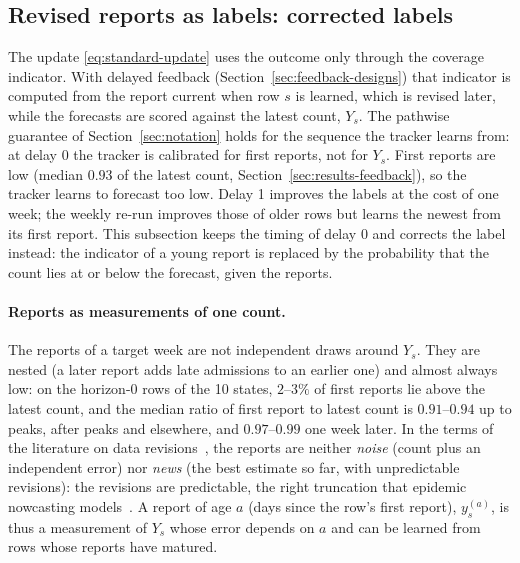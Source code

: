 \documentclass[11pt,a4paper]{article}
\theoremstyle{definition}
\theoremstyle{remark}
\begin{document}
\subsection{Revised reports as labels: corrected labels}
\label{sec:corrected-labels}
The update \eqref{eq:standard-update} uses the outcome only through the
coverage indicator. With delayed feedback
(Section~\ref{sec:feedback-designs}) that indicator is computed from the
report current when row $s$ is learned, which is revised later, while the
forecasts are scored against the latest count, $Y_s$. The pathwise
guarantee of Section~\ref{sec:notation} holds for the sequence the tracker
learns from: at delay 0 the tracker is calibrated for first reports, not
for $Y_s$. First reports are low (median $0.93$ of the latest count,
Section~\ref{sec:results-feedback}), so the tracker learns to forecast too
low. Delay 1 improves the labels at the cost of one week; the weekly
re-run improves those of older rows but learns the newest from its first
report. This subsection keeps the timing of delay 0 and corrects the label
instead: the indicator of a young report is replaced by the probability
that the count lies at or below the forecast, given the reports.

\paragraph{Reports as measurements of one count.} The reports of a target
week are not independent draws around $Y_s$. They are nested (a later
report adds late admissions to an earlier one) and almost always low: on
the horizon-0 rows of the 10 states, $2$--$3\%$ of first reports lie above
the latest count, and the median ratio of first report to latest count is
$0.91$--$0.94$ up to peaks, after peaks and elsewhere, and $0.97$--$0.99$
one week later. In the terms of the literature on data
revisions~\cite{mankiw-shapiro}, the reports are neither \emph{noise}
(count plus an independent error) nor \emph{news} (the best estimate so
far, with unpredictable revisions): the revisions are predictable, the
right truncation that epidemic nowcasting
models~\cite{hoehle-nowcasting,nobbs}. A report of age $a$ (days since the
row's first report), $y_s^{(a)}$, is thus a measurement of $Y_s$ whose
error depends on $a$ and can be learned from rows whose reports have
matured.
\end{document}
